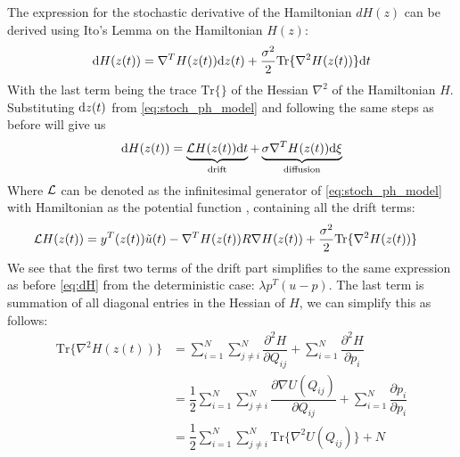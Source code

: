 The expression for the stochastic derivative of the Hamiltonian $dH(z)$ can be derived using Ito's Lemma on the Hamiltonian $H(z)$:
\begin{equation*}
    \mathrm d H(z(t)) = \nabla^T H(z(t)) \mathrm d z(t) + \dfrac{\sigma^2}{2}\text{Tr}\{\nabla^2H(z(t))\}\mathrm d t
\end{equation*}
With the last term being the trace $\text{Tr\{\}}$ of the Hessian $\nabla^2$ of the Hamiltonian $H$.
Substituting $\mathrm d z(t)$ from \autoref{eq:stoch_ph_model} and following the same steps as before will give us
\begin{gather*}
    \begin{aligned}
        \mathrm d H(z(t)) = \underbrace{\mathcal L H(z(t))\mathrm d t}_{\text{drift}} + \underbrace{\sigma \nabla^T H(z(t)) \mathrm d \xi}_{\text{diffusion}}
    \end{aligned}
\end{gather*}
Where $\mathcal L$ can be denoted as the infinitesimal generator of \autoref{eq:stoch_ph_model} with Hamiltonian as the potential function \cite{rudiger2024stability}, containing all the drift terms:
\begin{gather*}
    \begin{aligned}
        \mathcal L H(z(t)) &= y^T(z(t))\tilde u(t) - \nabla^T H(z(t))R \nabla H(z(t)) + \dfrac{\sigma^2}{2}\text{Tr}\{\nabla^2H(z(t))\} 
    \end{aligned}
\end{gather*}
We see that the first two terms of the drift part simplifies to the same expression as before \autoref{eq:dH} from the deterministic case: $\lambda p^T(u-p)$. The last term is summation of all diagonal entries in the Hessian of $H$, we can simplify this as follows:
\begin{align}
    \text{Tr}\{\nabla^2H(z(t))\} &= \sum^N_{i=1}\sum^N_{j\neq i} \dfrac{\partial^2 H}{\partial Q_{ij}} + \sum^N_{i=1} \dfrac{\partial^2 H}{\partial p_i} \nonumber\\
    &= \dfrac{1}{2}\sum^N_{i=1}\sum^N_{j\neq i} \dfrac{\partial \nabla U(Q_{ij}) }{\partial Q_{ij}} + \sum^N_{i=1} \dfrac{\partial p_i}{\partial p_i} \nonumber \\
    &= \dfrac{1}{2}\sum^N_{i=1}\sum^N_{j\neq i} \text{Tr}\{\nabla^2 U(Q_{ij})\}+ N
    \label{eq:trace_ddH}
\end{align}
